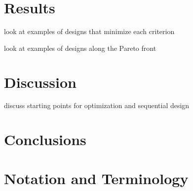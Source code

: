 \documentclass[review]{elsarticle}
\begin{document}
\section{Results}

look at examples of designs that minimize each criterion

look at examples of designs along the Pareto front


\section{Discussion}

discuss starting points for optimization and sequential design


\section{Conclusions}


\appendix
\section{Notation and Terminology}
\end{document}
